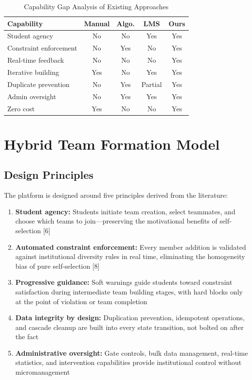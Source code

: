 \documentclass[12pt,a4paper]{article}
\begin{document}
\begin{table}[H]
\centering
\caption{Capability Gap Analysis of Existing Approaches}
\begin{tabular}{@{}lcccc@{}}
\toprule
\textbf{Capability} & \textbf{Manual} & \textbf{Algo.} & \textbf{LMS} & \textbf{Ours} \\
\midrule
Student agency & No & No & Yes & Yes \\
Constraint enforcement & No & Yes & No & Yes \\
Real-time feedback & No & No & No & Yes \\
Iterative building & Yes & No & Yes & Yes \\
Duplicate prevention & No & Yes & Partial & Yes \\
Admin oversight & No & Yes & Yes & Yes \\
Zero cost & Yes & No & No & Yes \\
\bottomrule
\end{tabular}
\end{table}

\section{Hybrid Team Formation Model}

\subsection{Design Principles}

The platform is designed around five principles derived from the literature:

\begin{enumerate}[noitemsep,topsep=3pt]
    \item \textbf{Student agency:} Students initiate team creation, select teammates, and choose which teams to join---preserving the motivational benefits of self-selection [6]
    \item \textbf{Automated constraint enforcement:} Every member addition is validated against institutional diversity rules in real time, eliminating the homogeneity bias of pure self-selection [8]
    \item \textbf{Progressive guidance:} Soft warnings guide students toward constraint satisfaction during intermediate team building stages, with hard blocks only at the point of violation or team completion
    \item \textbf{Data integrity by design:} Duplication prevention, idempotent operations, and cascade cleanup are built into every state transition, not bolted on after the fact
    \item \textbf{Administrative oversight:} Gate controls, bulk data management, real-time statistics, and intervention capabilities provide institutional control without micromanagement
\end{enumerate}
\end{document}
